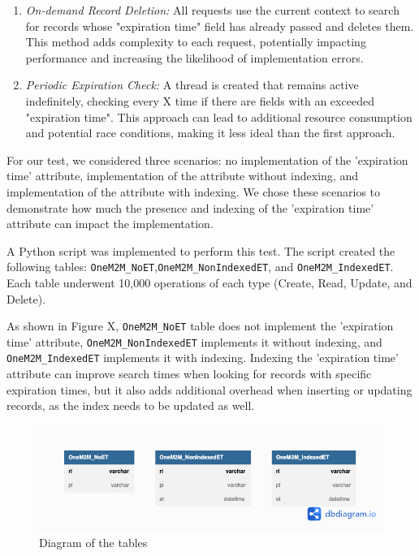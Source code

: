 \documentclass[a4paper,fleqn]{cas-dc}
\begin{document}
\begin{enumerate}
    \item \textit{On-demand Record Deletion:} All requests use the current context to search for records whose "expiration time" field has already passed and deletes them. This method adds complexity to each request, potentially impacting performance and increasing the likelihood of implementation errors.
    \item \textit{Periodic Expiration Check:} A thread is created that remains active indefinitely, checking every X time if there are fields with an exceeded "expiration time". This approach can lead to additional resource consumption and potential race conditions, making it less ideal than the first approach.
\end{enumerate}

For our test, we considered three scenarios: no implementation of the 'expiration time' attribute, implementation of the attribute without indexing, and implementation of the attribute with indexing. We chose these scenarios to demonstrate how much the presence and indexing of the 'expiration time' attribute can impact the implementation.

A Python script was implemented to perform this test. The script created the following tables: \texttt{OneM2M\_NoET},\newline \texttt{OneM2M\_NonIndexedET}, and \texttt{OneM2M\_IndexedET}. Each table underwent 10,000 operations of each type (Create, Read, Update, and Delete).

As shown in Figure X, \texttt{OneM2M\_NoET} table does not implement the 'expiration time' attribute, \texttt{OneM2M\_NonIndexedET} implements it without indexing, and \texttt{OneM2M\_IndexedET} implements it with indexing. Indexing the 'expiration time' attribute can improve search times when looking for records with specific expiration times, but it also adds additional overhead when inserting or updating records, as the index needs to be updated as well.

\begin{figure}[h]
\centering
\includegraphics[width=\linewidth]{TestExpirationTime}
\caption{Diagram of the tables}
\label{fig:tableDiagram}
\end{figure}
\end{document}
